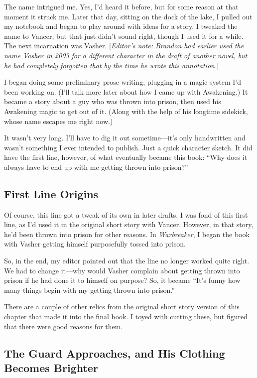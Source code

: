 The name intrigued me. Yes, I’d heard it before, but for some reason at that moment it struck me. Later that day, sitting on the dock of the lake, I pulled out my notebook and began to play around with ideas for a story. I tweaked the name to Vancer, but that just didn’t sound right, though I used it for a while. The next incarnation was Vasher. [\textit{Editor’s note: Brandon had earlier used the name Vasher in 2003 for a different character in the draft of another novel, but he had completely forgotten that by the time he wrote this annotation.}]

I began doing some preliminary prose writing, plugging in a magic system I’d been working on. (I’ll talk more later about how I came up with Awakening.) It became a story about a guy who was thrown into prison, then used his Awakening magic to get out of it. (Along with the help of his longtime sidekick, whose name escapes me right now.)

It wasn’t very long. I’ll have to dig it out sometime—it’s only handwritten and wasn’t something I ever intended to publish. Just a quick character sketch. It did have the first line, however, of what eventually became this book: “Why does it always have to end up with me getting thrown into prison?”

\subsection*{First Line Origins}

Of course, this line got a tweak of its own in later drafts. I was fond of this first line, as I’d used it in the original short story with Vancer. However, in that story, he’d been thrown into prison for other reasons. In \textit{Warbreaker}, I began the book with Vasher getting himself purposefully tossed into prison.

So, in the end, my editor pointed out that the line no longer worked quite right. We had to change it—why would Vasher complain about getting thrown into prison if he had done it to himself on purpose? So, it became “It’s funny how many things begin with my getting thrown into prison.”

\orn

There are a couple of other relics from the original short story version of this chapter that made it into the final book. I toyed with cutting these, but figured that there were good reasons for them.

\subsection*{The Guard Approaches, and His Clothing Becomes Brighter}


